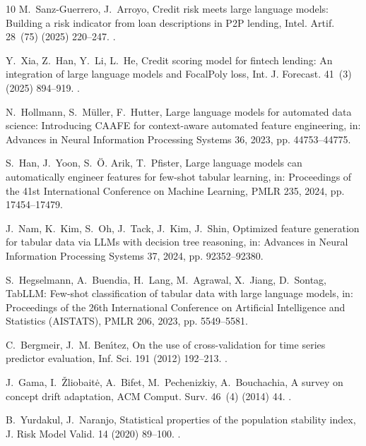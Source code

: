 \documentclass[final,5p,twocolumn]{elsarticle}
\begin{document}
\begin{thebibliography}{10}
M.~Sanz-Guerrero, J.~Arroyo, Credit risk meets large language models: Building
  a risk indicator from loan descriptions in {P2P} lending, Intel. Artif. 28~(75) (2025) 220--247.
\newblock \href {https://doi.org/10.4114/intartif.vol28iss75pp220-247}
  {}.

Y.~Xia, Z.~Han, Y.~Li, L.~He, Credit scoring model for fintech lending: An
  integration of large language models and {FocalPoly} loss, Int. J. Forecast. 41~(3) (2025) 894--919.
\newblock \href {https://doi.org/10.1016/j.ijforecast.2024.07.005}
  {}.

N.~Hollmann, S.~M{\"u}ller, F.~Hutter, Large language models for automated data
  science: Introducing {CAAFE} for context-aware automated feature engineering,
  in: Advances in Neural Information Processing Systems 36, 2023, pp.
  44753--44775.

S.~Han, J.~Yoon, S.~{\"O}. Arik, T.~Pfister, Large language models can
  automatically engineer features for few-shot tabular learning, in: Proceedings
  of the 41st International Conference on Machine Learning, PMLR 235, 2024, pp.
  17454--17479.

J.~Nam, K.~Kim, S.~Oh, J.~Tack, J.~Kim, J.~Shin, Optimized feature generation
  for tabular data via {LLMs} with decision tree reasoning, in: Advances in
  Neural Information Processing Systems 37, 2024, pp. 92352--92380.

S.~Hegselmann, A.~Buendia, H.~Lang, M.~Agrawal, X.~Jiang, D.~Sontag, {TabLLM}:
  Few-shot classification of tabular data with large language models, in:
  Proceedings of the 26th International Conference on Artificial Intelligence
  and Statistics (AISTATS), PMLR 206, 2023, pp. 5549--5581.

C.~Bergmeir, J.~M. Ben{\'\i}tez, On the use of cross-validation for time series
  predictor evaluation, Inf. Sci. 191 (2012) 192--213.
\newblock \href {https://doi.org/10.1016/j.ins.2011.12.028}
  {}.

J.~Gama, I.~{\v{Z}}liobait{\.e}, A.~Bifet, M.~Pechenizkiy, A.~Bouchachia, A
  survey on concept drift adaptation, ACM Comput. Surv. 46~(4) (2014) 44.
\newblock \href {https://doi.org/10.1145/2523813} {}.

B.~Yurdakul, J.~Naranjo, Statistical properties of the population stability
  index, J. Risk Model Valid. 14 (2020) 89--100.
\newblock \href {https://doi.org/10.21314/JRMV.2020.227}
  {}.


\end{thebibliography}
\end{document}
